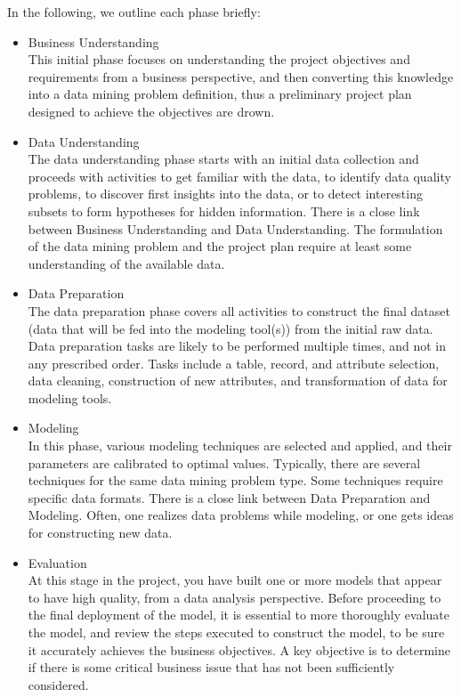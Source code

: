 In the following, we outline each phase briefly:
\begin{itemize}
\item Business Understanding\\
This initial phase focuses on understanding the project objectives and requirements from a
business perspective, and then converting this knowledge into a data mining problem
definition, thus a preliminary project plan designed to achieve the objectives are drown.
\item Data Understanding\\
The data understanding phase starts with an initial data collection and proceeds with activities
to get familiar with the data, to identify data quality problems, to discover first
insights into the data, or to detect interesting subsets to form hypotheses for hidden
information.
There is a close link between Business Understanding and Data Understanding. The
formulation of the data mining problem and the project plan require at least some
understanding of the available data.
\item Data Preparation\\
The data preparation phase covers all activities to construct the final dataset (data that will be
fed into the modeling tool(s)) from the initial raw data. Data preparation tasks are likely to be
performed multiple times, and not in any prescribed order. Tasks include a table, record, and attribute selection, data cleaning, construction of new attributes, and transformation of data for
modeling tools.
\item Modeling\\
In this phase, various modeling techniques are selected and applied, and their parameters are
calibrated to optimal values. Typically, there are several techniques for the same data mining
problem type. Some techniques require specific data formats.
There is a close link between Data Preparation and Modeling. Often, one realizes data
problems while modeling, or one gets ideas for constructing new data.
\item Evaluation\\
At this stage in the project, you have built one or more models that appear to have high quality,
from a data analysis perspective. Before proceeding to the final deployment of the model, it is
essential to more thoroughly evaluate the model, and review the steps executed to construct
the model, to be sure it accurately achieves the business objectives. A key objective is to
determine if there is some critical business issue that has not been sufficiently considered.

\end{itemize}
